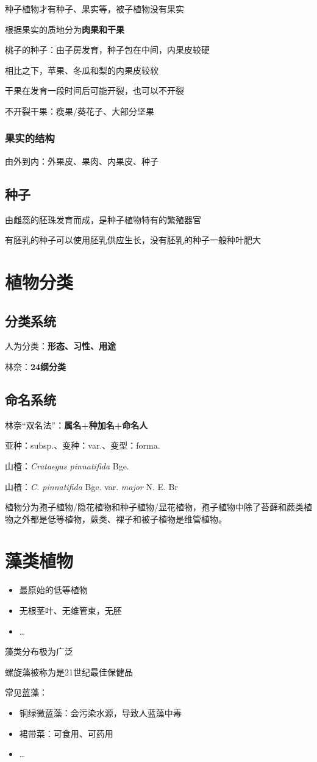 \begin{notation}
    种子植物才有种子、果实等，被子植物没有果实
\end{notation}
根据果实的质地分为\textbf{肉果和干果}
\begin{eg}
    桃子的种子：由子房发育，种子包在中间，内果皮较硬

    相比之下，苹果、冬瓜和梨的内果皮较软
\end{eg}
干果在发育一段时间后可能开裂，也可以不开裂
\begin{eg}
    不开裂干果：瘦果/葵花子、大部分坚果
\end{eg}
\subsubsection*{果实的结构}%
\label{subsub*:果实的结构}
由外到内：外果皮、果肉、内果皮、种子
\subsection{种子}%
\label{sub:种子}
由雌蕊的胚珠发育而成，是种子植物特有的繁殖器官
\begin{notation}
    有胚乳的种子可以使用胚乳供应生长，没有胚乳的种子一般种叶肥大
\end{notation}
\section{植物分类}%
\label{sec:植物分类}
\subsection{分类系统}%
\label{sub:分类系统}
人为分类：\textbf{形态、习性、用途}

林奈：\textbf{24纲分类}
\subsection{命名系统}%
\label{sub:命名系统}
林奈“双名法”：\textbf{属名+种加名+命名人}

亚种：subsp.、变种：var.、变型：forma.

\begin{eg}
    山楂：\textit{Crataegus pinnatifida} Bge.

    山楂：\textit{C. pinnatifida} Bge. var. \textit{major} N. E. Br
\end{eg}
植物分为孢子植物/隐花植物和种子植物/显花植物，孢子植物中除了苔藓和蕨类植物之外都是低等植物，蕨类、裸子和被子植物是维管植物。
\section{藻类植物}%
\label{sec:藻类植物}
\begin{itemize}
    \item 最原始的低等植物
    \item 无根茎叶、无维管束，无胚
    \item \ldots 
\end{itemize}
藻类分布极为广泛
\begin{notation}
    螺旋藻被称为是21世纪最佳保健品
\end{notation}
常见蓝藻：
\begin{itemize}
    \item 铜绿微蓝藻：会污染水源，导致人蓝藻中毒
    \item 裙带菜：可食用、可药用
    \item \ldots 
    
\end{itemize}
